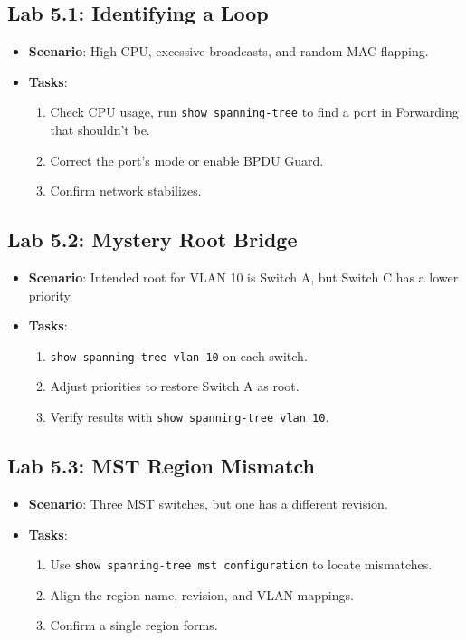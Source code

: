 \documentclass[a4paper]{report}
\begin{document}
\subsection*{Lab 5.1: Identifying a Loop}
\begin{itemize}
    \item \textbf{Scenario}: High CPU, excessive broadcasts, and random MAC flapping.
    \item \textbf{Tasks}:
    \begin{enumerate}
        \item Check CPU usage, run \texttt{show spanning-tree} to find a port in Forwarding that shouldn’t be.
        \item Correct the port’s mode or enable BPDU Guard.
        \item Confirm network stabilizes.
    \end{enumerate}
\end{itemize}

\subsection*{Lab 5.2: Mystery Root Bridge}
\begin{itemize}
    \item \textbf{Scenario}: Intended root for VLAN 10 is Switch A, but Switch C has a lower priority.
    \item \textbf{Tasks}:
    \begin{enumerate}
        \item \texttt{show spanning-tree vlan 10} on each switch.
        \item Adjust priorities to restore Switch A as root.
        \item Verify results with \texttt{show spanning-tree vlan 10}.
    \end{enumerate}
\end{itemize}

\subsection*{Lab 5.3: MST Region Mismatch}
\begin{itemize}
    \item \textbf{Scenario}: Three MST switches, but one has a different revision.
    \item \textbf{Tasks}:
    \begin{enumerate}
        \item Use \texttt{show spanning-tree mst configuration} to locate mismatches.
        \item Align the region name, revision, and VLAN mappings.
        \item Confirm a single region forms.
    \end{enumerate}
\end{itemize}
\end{document}
